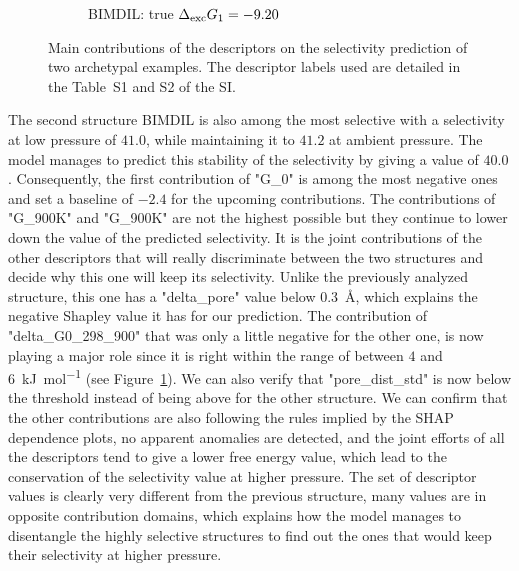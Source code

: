 \documentclass[main]{subfiles}
\begin{document}
\begin{figure}[ht]
\begin{subfigure}[b]{0.47\textwidth}
      \caption{BIMDIL: true $\Delta_{\text{exc}} G_1=-9.20$}
    \end{subfigure}
  \caption{Main contributions of the descriptors on the selectivity prediction of two archetypal examples. The descriptor labels used are detailed in the Table~S1 and S2 of the SI.}
  \label{fgr:contribution}
\end{figure}

The second structure BIMDIL is also among the most selective with a selectivity at low pressure of $41.0$, while maintaining it to $41.2$ at ambient pressure. The model manages to predict this stability of the selectivity by giving a value of $40.0$. Consequently, the first contribution of "G\_0" is among the most negative ones and set a baseline of $-2.4$ for the upcoming contributions. The contributions of "G\_900K" and "G\_900K" are not the highest possible but they continue to lower down the value of the predicted selectivity. It is the joint contributions of the other descriptors that will really discriminate between the two structures and decide why this one will keep its selectivity. Unlike the previously analyzed structure, this one has a "delta\_pore" value below \SI{0.3}{\angstrom}, which explains the negative Shapley value it has for our prediction. The contribution of "delta\_G0\_298\_900" that was only a little negative for the other one, is now playing a major role since it is right within the range of between $4$ and \SI{6}{\kilo\joule\per\mole} (see Figure~\ref{fgr:contribution}). We can also verify that "pore\_dist\_std" is now below the threshold instead of being above for the other structure. We can confirm that the other contributions are also following the rules implied by the SHAP dependence plots, no apparent anomalies are detected, and the joint efforts of all the descriptors tend to give a lower free energy value, which lead to the conservation of the selectivity value at higher pressure. The set of descriptor values is clearly very different from the previous structure, many values are in opposite contribution domains, which explains how the model manages to disentangle the highly selective structures to find out the ones that would keep their selectivity at higher pressure.
\end{document}
